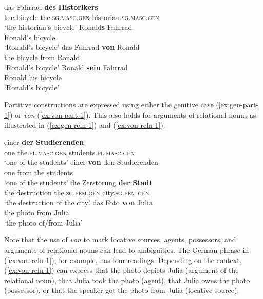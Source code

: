 \documentclass[lucida]{sp} %
\begin{document}
\begin{exe}
\ex \label{ex:gen-poss-1} \gll das Fahrrad \textbf{des} \textbf{Historikers} \\
the bicycle the.\textsc{sg}.\textsc{masc}.\textsc{gen} historian.\textsc{sg}.\textsc{masc}.\textsc{gen} \\
`the historian's bicycle'
\ex \label{ex:s-poss-1} \gll Ronald\textbf{s} Fahrrad \\
Ronald's bicycle \\
`Ronald's bicycle'
\ex \label{ex:von-poss-1} \gll das Fahrrad \textbf{von} Ronald \\
the bicycle from Ronald\\
`Ronald's bicycle'
\ex \label{ex:pron-poss-1} \gll Ronald \textbf{sein} Fahrrad \\
Ronald his bicycle \\
`Ronald's bicycle'
\end{exe}
Partitive constructions are expressed using either the genitive case (\ref{ex:gen-part-1}) or \textit{von} (\ref{ex:von-part-1}). This also holds for arguments of relational nouns \citep{barker1995} as illustrated in (\ref{ex:gen-reln-1}) and (\ref{ex:von-reln-1}).
\begin{exe}
\ex \label{ex:gen-part-1} \gll einer \textbf{der} \textbf{Studierenden} \\
one the.\textsc{pl}.\textsc{masc}.\textsc{gen} students.\textsc{pl}.\textsc{masc}.\textsc{gen} \\
`one of the students'
\ex \label{ex:von-part-1} \gll einer \textbf{von} den Studierenden \\
one from the students\\
`one of the students'
\ex \label{ex:gen-reln-1} \gll die Zerstörung \textbf{der} \textbf{Stadt} \\
the destruction the.\textsc{sg}.\textsc{fem}.\textsc{gen} city.\textsc{sg}.\textsc{fem}.\textsc{gen} \\
`the destruction of the city'
\ex \label{ex:von-reln-1} \gll das Foto \textbf{von} Julia \\
the photo from Julia\\
`the photo of/from Julia'
\end{exe}
Note that the use of \textit{von} to mark locative sources, agents, possessors, and arguments of relational nouns can lead to ambiguities. The German phrase in (\ref{ex:von-reln-1}), for example, has four readings. Depending on the context, (\ref{ex:von-reln-1}) can express that the photo depicts Julia (argument of the relational noun), that Julia took the photo (agent), that Julia owns the photo (possessor), or that the speaker got the photo from Julia (locative source).
\end{document}

